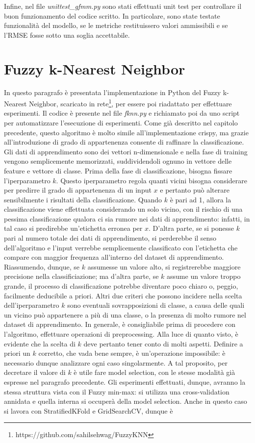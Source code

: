 \documentclass[11pt,  oneside, openany]{book}
\begin{document}
 
Infine, nel file \textit {unittest\_gfmm.py} sono stati effettuati unit test per controllare il buon funzionamento del codice scritto. In particolare, sono state testate funzionalità del modello, se le metriche restituissero valori ammissibili e se l'RMSE fosse sotto una soglia accettabile. 


	\section{Fuzzy k-Nearest Neighbor}
In questo paragrafo è presentata l'implementazione in Python del Fuzzy k-Nearest Neighbor, scaricato in rete\footnote{https://github.com/sahilsehwag/FuzzyKNN}, per essere poi riadattato per effettuare esperimenti. Il codice è presente nel file \textit{fknn.py} e richiamato poi da uno script per automatizzare l'esecuzione di esperimenti. Come già descritto nel capitolo precedente, questo algoritmo è molto simile all'implementazione crispy, ma grazie all'introduzione di grado di appartenenza consente di raffinare la classificazione. Gli dati di apprendimento sono dei vettori n-dimensionale e nella fase di training vengono semplicemente memorizzati, suddividendoli ognuno in vettore delle feature e vettore di classe. Prima della fase di classificazione, bisogna fissare l'iperparametro $k$. Questo iperparametro regola quanti vicini bisogna considerare per predirre il grado di appartenenza di un input $x$ e pertanto può alterare sensibilmente i risultati della classificazione. Quando $k$ è pari ad 1, allora la classificazione viene effettuata considerando un solo vicino, con il rischio di una pessima classificazione qualora ci sia rumore nei dati di apprendimento: infatti, in tal caso si predirebbe un'etichetta erronea per $x$. D'altra parte, se si ponesse $k$ pari al numero totale dei dati di apprendimento, si perderebbe il senso dell'algoritmo e l'input verrebbe semplicemente classificato con l'etichetta che compare con maggior frequenza all'interno del dataset di apprendimento. Riassumendo, dunque, se $k$ assumesse un valore alto, si registrerebbe maggiore precisione nella classificiazione; ma d'altra parte, se $k$ assume un valore troppo grande, il processo di classificazione potrebbe diventare poco chiaro o, peggio, facilmente deducibile a priori. Altri due criteri che possono incidere nella scelta dell'iperparametro $k$  sono eventuali sovrapposizioni di classe, a causa delle quali un vicino può appartenere a più di una classe, o la presenza di molto rumore nel dataset di apprendimento. In generale, è consigliabile prima di procedere con l'algoritmo, effettuare operazioni di preprocessing. Alla luce di quanto visto, è evidente che la scelta di $k$ deve pertanto tener conto di molti aspetti. Definire a priori un $k$ corretto, che vada bene sempre, è un'operazione impossibile: è necessario dunque analizzare ogni caso singolarmente. A tal proposito, per decretare il valore di $k$ è utile fare model selection, con le stesse modalità già espresse nel paragrafo precedente. Gli esperimenti effettuati, dunque, avranno la stessa struttura vista con il Fuzzy min-max: si utilizza una cross-validation annidata e quella interna si occuperà della model selection. Anche in questo caso si lavora con StratifiedKFold e GridSearchCV, dunque è 
\end{document}
